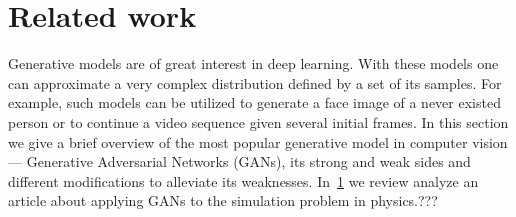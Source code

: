 

\section{Related work}
Generative models are of great interest in deep learning. With these models one can approximate a very complex distribution defined by a set of its samples. 
For example, such models can be utilized to generate a face image of a never existed person or to continue a video sequence given several initial frames. 
In this section we give a brief overview of the most popular generative model in computer vision — Generative Adversarial Networks (GANs),
 its strong and weak sides and different modifications to alleviate its weaknesses. In~\cref{} we review analyze an article about applying GANs to the simulation problem in physics.???
